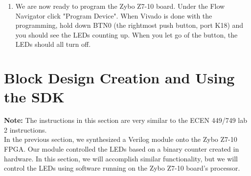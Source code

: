 \documentclass[11pt,twoside,titlepage]{article}
\begin{document}
\begin{enumerate}
\begin{enumerate}
			\item We are now ready to program the Zybo Z7-10 board. Under the Flow Navigator click "Program Device". When Vivado is done with the programming, hold down BTN0 (the rightmost push button, port K18) and you should see the LEDs counting up. When you let go of the button, the LEDs should all turn off.
				
			\end{enumerate}
		
		\end{enumerate}


\section{Block Design Creation and Using the SDK}

	\textbf{Note:} The instructions in this section are very similar to the ECEN 449/749 lab 2 instructions.\\

	\noindent
	In the previous section, we synthesized a Verilog module onto the Zybo Z7-10 FPGA. Our module controlled the LEDs based on a binary counter created in hardware. In this section, we will accomplish similar functionality, but we will control the LEDs using software running on the Zybo Z7-10 board's processor.\\
	
\end{document}
